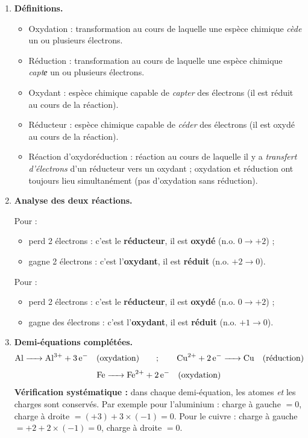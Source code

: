 \documentclass[11pt]{article}
\newcommand{\cle}[1]{{\popxbold\color{popdark}#1}}
\begin{document}
\begin{corrige}
\begin{enumerate}
\item \textbf{Définitions.}
\begin{itemize}
\item \cle{Oxydation} : transformation au cours de laquelle une espèce chimique \emph{cède} un ou plusieurs électrons.
\item \cle{Réduction} : transformation au cours de laquelle une espèce chimique \emph{captе} un ou plusieurs électrons.
\item \cle{Oxydant} : espèce chimique capable de \emph{capter} des électrons (il est réduit au cours de la réaction).
\item \cle{Réducteur} : espèce chimique capable de \emph{céder} des électrons (il est oxydé au cours de la réaction).
\item \cle{Réaction d'oxydoréduction} : réaction au cours de laquelle il y a \emph{transfert d'électrons} d'un réducteur vers un oxydant ; oxydation et réduction ont toujours lieu simultanément (pas d'oxydation sans réduction).
\end{itemize}

\item \textbf{Analyse des deux réactions.}

Pour  :
\begin{itemize}
\item {} perd 2 électrons : c'est le \textbf{réducteur}, il est \textbf{oxydé} (n.o. $0 \to +2$) ;
\item {} gagne 2 électrons : c'est l'\textbf{oxydant}, il est \textbf{réduit} (n.o. $+2 \to 0$).
\end{itemize}

Pour  :
\begin{itemize}
\item {} perd 2 électrons : c'est le \textbf{réducteur}, il est \textbf{oxydé} (n.o. $0 \to +2$) ;
\item {} gagne des électrons : c'est l'\textbf{oxydant}, il est \textbf{réduit} (n.o. $+1 \to 0$).
\end{itemize}

\item \textbf{Demi-équations complétées.}
\[ \ce{Al -> Al^3+ + 3e-} \quad \text{(oxydation)} \qquad ; \qquad \ce{Cu^2+ + 2e- -> Cu} \quad \text{(réduction)} \]
\[ \ce{Fe -> Fe^2+ + 2e-} \quad \text{(oxydation)} \]
\textbf{Vérification systématique :} dans chaque demi-équation, les atomes \emph{et} les charges sont conservés. Par exemple pour l'aluminium : charge à gauche $= 0$, charge à droite $= (+3) + 3\times(-1) = 0$. Pour le cuivre : charge à gauche $= +2 + 2\times(-1) = 0$, charge à droite $= 0$.
\end{enumerate}
\end{corrige}
\end{document}

